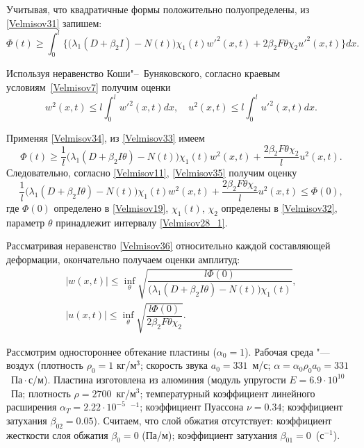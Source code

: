 Учитывая, что квадратичные формы положительно полуопределены, из \eqref{Velmisov31} запишем:
\begin{equation} \label{Velmisov33} 
\Phi(t)\ge \int_{0}^{l}
\bigl\{
\bigl(\lambda_1(D+\beta _{2}I ) -N(t)\bigr)\chi_1(t)w'^{2} (x,t)+2\beta _{2}F \theta\chi_2 u'^{2} (x,t)\bigr
\}dx.
\end{equation}

Используя неравенство Коши"--~Буняковского, согласно краевым условиям~\eqref{Velmisov7} получим оценки
\begin{equation} \label{Velmisov34} 
w^{2} (x,t)\le l\int_{0}^{l} w'^{2} (x,t) dx, \quad u^{2} (x,t)\le l\int_{0}^{l} u'^{2} (x,t) dx. 
\end{equation}

Применяя \eqref{Velmisov34}, из \eqref{Velmisov33} имеем
\begin{equation} \label{Velmisov35} 
\Phi(t)\ge \frac{1}{l}
\bigl(\lambda_1(D+\beta _{2}I \theta) -N(t)\bigr)\chi_1(t)w^{2} (x,t)+
\frac{2\beta _{2}F \theta\chi_2}{l} u^{2} (x,t).
\end{equation}
Следовательно, согласно  \eqref{Velmisov11}, \eqref{Velmisov35} получим оценку
\begin{equation} \label{Velmisov36} 
\frac{1}{l}
\bigl(\lambda_1(D+\beta _{2}I \theta) -N(t)\bigr)\chi_1(t)w^{2} (x,t)+
\frac{2\beta _{2}F \theta\chi_2}{l} u^{2} (x,t)\le\Phi(0),
 \end{equation}
где $\Phi(0)$ определено в \eqref{Velmisov19}, $\chi_1(t)$, $\chi_2$ определены в \eqref{Velmisov32}, параметр $\theta$ принадлежит интервалу \eqref{Velmisov28_1}.

Рассматривая неравенство \eqref{Velmisov36} относительно каждой составляющей деформации, окончательно получаем оценки амплитуд:
\begin{equation} \label{Velmisov37}
\begin{array}{l}
|w(x,t)|\le\inf\limits_{\theta}\sqrt{\dfrac{l\Phi(0)}{\bigl(\lambda_1(D+\beta _{2}I \theta)- N(t)\bigr)\chi_1(t)}},
\\[2mm]
|u(x,t)|\le\inf\limits_{\theta}\sqrt{\dfrac{l\Phi(0)}{2\beta _{2}F \theta\chi_2}}.
\end{array}
\end{equation}

\smallskip

Рассмотрим одностороннее обтекание пластины ($\alpha_0=1$). 
Рабочая среда "--- 
воздух (плотность $\rho_0 = 1$ кг/м$^3$; 
скорость звука $a_0=331$~м/с; 
$\alpha =\alpha _{0} \rho _{0} a_{0}=331$~Па${}\cdot{}$с/м).
Пластина изготовлена из алюминия (модуль упругости $E = 6.9 \cdot 10^{10}$~Па; 
плотность $\rho = 2700$~кг/м$^3$; температурный коэффициент линейного расширения  $\alpha _{T}=2.22 \cdot 10^{-5} $~\textcelsius$^{-1}$; коэффициент Пуассона $\nu=0.34$; коэффициент затухания $\beta_{02}=0.05$). 
Считаем, что слой обжатия отсутствует: коэффициент жесткости слоя обжатия $\beta _{0}=0$ (Па/м);  коэффициент затухания $\beta _{01}=0$~(с$^{-1}$).   

